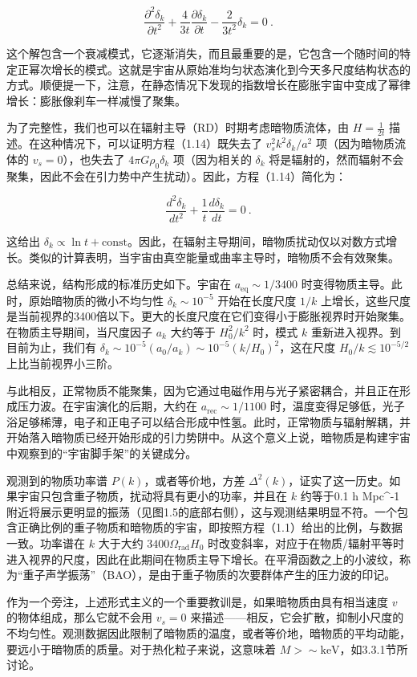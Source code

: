 \[ \frac{\partial^2 \delta_k}{\partial t^2} + \frac{4}{3t} \frac{\partial \delta_k}{\partial t} - \frac{2}{3t^2} \delta_k = 0 ~. \]

这个解包含一个衰减模式，它逐渐消失，而且最重要的是，它包含一个随时间的特定正幂次增长的模式。这就是宇宙从原始准均匀状态演化到今天多尺度结构状态的方式。顺便提一下，注意，在静态情况下发现的指数增长在膨胀宇宙中变成了幂律增长：膨胀像刹车一样减慢了聚集。

为了完整性，我们也可以在辐射主导（RD）时期考虑暗物质流体，由 \( H = \frac{1}{2t} \) 描述。在这种情况下，可以证明方程（1.14）既失去了 \( v_s^2 k^2 \delta_k/a^2 \) 项（因为暗物质流体的 \( v_s = 0 \)），也失去了 \( 4\pi G \rho_0 \delta_k \) 项（因为相关的 \( \delta_k \) 将是辐射的，然而辐射不会聚集，因此不会在引力势中产生扰动）。因此，方程（1.14）简化为：

\[ \frac{d^2 \delta_k}{dt^2} + \frac{1}{t} \frac{d \delta_k}{dt} = 0 ~. \]

这给出 \( \delta_k \propto \ln t + \text{const} \)。因此，在辐射主导期间，暗物质扰动仅以对数方式增长。类似的计算表明，当宇宙由真空能量或曲率主导时，暗物质不会有效聚集。

总结来说，结构形成的标准历史如下。宇宙在 \( a_{\text{eq}} \sim 1/3400 \) 时变得物质主导。此时，原始暗物质的微小不均匀性 \( \delta_k \sim 10^{-5} \) 开始在长度尺度 \( 1/k \) 上增长，这些尺度是当前视界的3400倍以下。更大的长度尺度在它们变得小于膨胀视界时开始聚集。在物质主导期间，当尺度因子 \( a_k \) 大约等于 \( H_0^2 / k^2 \) 时，模式 \( k \) 重新进入视界。到目前为止，我们有 \( \delta_k \sim 10^{-5}(a_0/a_k) \sim 10^{-5}(k/H_0)^2 \)，这在尺度 \( H_0/k \lesssim 10^{-5/2} \) 上比当前视界小三阶。

与此相反，正常物质不能聚集，因为它通过电磁作用与光子紧密耦合，并且正在形成压力波。在宇宙演化的后期，大约在 \( a_{\text{rec}} \sim 1/1100 \) 时，温度变得足够低，光子浴足够稀薄，电子和正电子可以结合形成中性氢。此时，正常物质与辐射解耦，并开始落入暗物质已经开始形成的引力势阱中。从这个意义上说，暗物质是构建宇宙中观察到的“宇宙脚手架”的关键成分。

观测到的物质功率谱 \( P(k) \)，或者等价地，方差 \( \Delta^2(k) \)，证实了这一历史。如果宇宙只包含重子物质，扰动将具有更小的功率，并且在 \( k \) 约等于0.1 h Mpc^-1 附近将展示更明显的振荡（见图1.5的底部右侧），这与观测结果明显不符。一个包含正确比例的重子物质和暗物质的宇宙，即按照方程（1.1）给出的比例，与数据一致。功率谱在 \( k \) 大于大约 \( 3400 \Omega_{\text{rad}} H_0 \) 时改变斜率，对应于在物质/辐射平等时进入视界的尺度，因此在此期间在物质主导下增长。在平滑函数之上的小波纹，称为“重子声学振荡”（BAO），是由于重子物质的次要群体产生的压力波的印记。

作为一个旁注，上述形式主义的一个重要教训是，如果暗物质由具有相当速度 \( v \) 的物体组成，那么它就不会用 \( v_s = 0 \) 来描述——相反，它会扩散，抑制小尺度的不均匀性。观测数据因此限制了暗物质的温度，或者等价地，暗物质的平均动能，要远小于暗物质的质量。对于热化粒子来说，这意味着 \( M > \sim \text{keV} \)，如3.3.1节所讨论。









 

